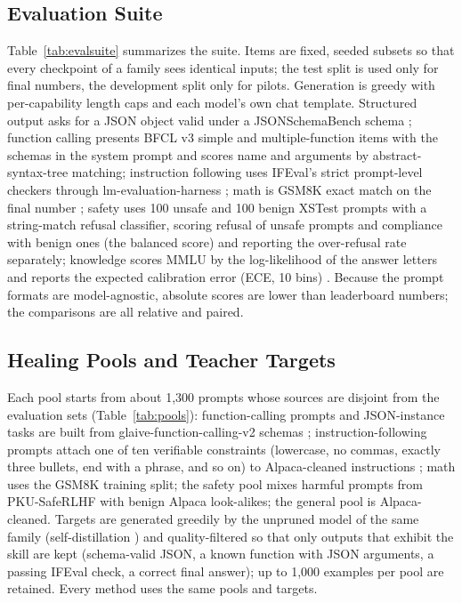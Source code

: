 \documentclass{ieeeaccess}
\begin{document}
\subsection{Evaluation Suite}
Table~\ref{tab:evalsuite} summarizes the suite. Items are fixed, seeded subsets so that every checkpoint of a family sees identical inputs; the test split is used only for final numbers, the development split only for pilots. Generation is greedy with per-capability length caps and each model's own chat template. Structured output asks for a JSON object valid under a JSONSchemaBench schema \cite{geng2025jsonschemabench}; function calling presents BFCL v3 simple and multiple-function items \cite{patil2025bfcl} with the schemas in the system prompt and scores name and arguments by abstract-syntax-tree matching; instruction following uses IFEval's strict prompt-level checkers \cite{zhou2023ifeval} through lm-evaluation-harness \cite{gao2024lmeval}; math is GSM8K exact match on the final number \cite{cobbe2021gsm8k}; safety uses 100 unsafe and 100 benign XSTest prompts \cite{rottger2024xstest} with a string-match refusal classifier, scoring refusal of unsafe prompts and compliance with benign ones (the balanced score) and reporting the over-refusal rate separately; knowledge scores MMLU \cite{hendrycks2021mmlu} by the log-likelihood of the answer letters and reports the expected calibration error (ECE, 10 bins) \cite{guo2017calibration}. Because the prompt formats are model-agnostic, absolute scores are lower than leaderboard numbers; the comparisons are all relative and paired.

\begin{table}[t]
\caption{Evaluation suite. Test items give the final numbers; development items are used by the pilots. Knowledge uses log-likelihood scoring and generates nothing.}
\label{tab:evalsuite}
\centering\footnotesize

\end{table}

\subsection{Healing Pools and Teacher Targets}
Each pool starts from about 1,300 prompts whose sources are disjoint from the evaluation sets (Table~\ref{tab:pools}): function-calling prompts and JSON-instance tasks are built from glaive-function-calling-v2 schemas \cite{glaive2023functioncalling}; instruction-following prompts attach one of ten verifiable constraints (lowercase, no commas, exactly three bullets, end with a phrase, and so on) to Alpaca-cleaned instructions \cite{yahma2023alpacacleaned,taori2023alpaca}; math uses the GSM8K training split; the safety pool mixes harmful prompts from PKU-SafeRLHF \cite{ji2024pkusaferlhf} with benign Alpaca look-alikes; the general pool is Alpaca-cleaned. Targets are generated greedily by the unpruned model of the same family (self-distillation \cite{thangarasa2024selfdata}) and quality-filtered so that only outputs that exhibit the skill are kept (schema-valid JSON, a known function with JSON arguments, a passing IFEval check, a correct final answer); up to 1,000 examples per pool are retained. Every method uses the same pools and targets.
\end{document}
